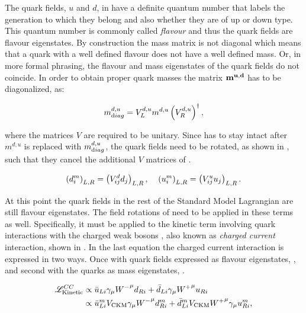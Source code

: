 The quark fields, $u$ and $d$,  in  have a definite quantum number that labels the generation to which they belong
and also whether they are of up or down type. This quantum number is commonly called {\it flavour} and thus the quark fields
are flavour eigenstates. By construction the mass matrix is not diagonal which means that
a quark with a well defined flavour does not have a well defined mass. Or, in more formal phrasing,
the flavour and mass eigenstates of the quark fields do not coincide. In order to obtain proper quark
masses the matrix $\bf m^{u,d}$ has to be diagonalized, as:

\begin{equation}
  \centering
  m^{d,u}_{\text diag} = V_L^{d,u} m^{d,u} \left(V_R^{d,u}\right)^{\dagger},
  \label{diagM}
\end{equation}

\noindent where the matrices $V$ are required to be unitary. Since  has to stay intact after $m^{d,u}$ is replaced with
$m^{d,u}_{\text diag}$, the quark fields need to be rotated, as shown in , such that they cancel the additional $V$ matrices
of .

\begin{equation}
  \centering
  \left( d_{i}^m \right)_{L,R} = \left( V^d_{ij} d_{j} \right)_{L,R}, \;\;\;\; \left( u_{i}^m \right)_{L,R} = \left( V^u_{ij} u_{j} \right)_{L,R}.
  \label{quark_rotation}
\end{equation}

\noindent At this point the quark fields in the rest of the Standard Model Lagrangian are still flavour eigenstates.
The field rotations of  need to be applied in these terms as well. Specifically, it must be
applied to the kinetic term involving quark interactions with the charged weak bosons \Wpm, also known as {\it charged current}
interaction, shown in . In the last equation the charged current interaction is expressed in two ways.
Once with quark fields expressed as flavour eigenstates, , and second with the quarks as mass eigenstates, .

\begin{subequations}
  \centering
  \begin{align}
    \mathscr{L}_{\text{Kinetic}}^{CC} & \propto \bar{u}_{Li} \gamma_\mu {\Wm}^\mu d_{Ri} + \bar{d}_{Li} \gamma_\mu {\Wp}^\mu u_{Ri}  \label{CClagrangianInt} \\
                                      & \propto \bar{u}_{Li}^m  {V_{\text{CKM}}} \gamma_\mu {\Wm}^\mu d_{Ri}^m + \bar{d}_{Li}^m V_{\text{CKM}} {\Wp}^\mu \gamma_\mu u_{Ri}^m, \label{CClagrangianMass}
  \end{align}
  \label{CClagrangian}
\end{subequations}

